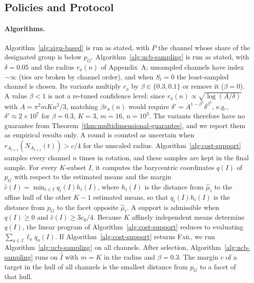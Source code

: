 \documentclass[twoside]{article}
\begin{document}
\FloatBarrier
\subsection{Policies and Protocol}
\label{app:exp-impl}

\paragraph{Algorithms.} Algorithm~\ref{alg:sign-based} is run as stated,
with \(P\) the channel whose share of the designated group is below
\(p_G\). Algorithm~\ref{alg:ucb-sampling} is run as stated, with
\(\delta=0.05\) and the radius \(r_a(n)\) of Appendix~A; unsampled
channels have index \(-\infty\) (ties are broken by channel order), and
when \(S_t=0\) the least-sampled channel is chosen. Its variants multiply
\(r_a\) by \(\beta\in\{0.3,0.1\}\) or remove it (\(\beta=0\)). A value \(\beta<1\) is not a re-tuned confidence level:
since \(r_a(n)\propto\sqrt{\log(A/\delta)}\) with \(A=\pi^2mKn^2/3\),
matching \(\beta r_a(n)\) would require \(\delta'=A^{1-\beta^2}\delta^{\beta^2}\),
e.g., \(\delta'\approx2\times10^7\) for \(\beta=0.3\), \(K=3\), \(m=16\),
\(n=10^3\). The variants therefore have no guarantee from
Theorem~\ref{thm:multidimensional-guarantee}, and we report them as
empirical results only. A round is counted as uncertain when
\(r_{A_{t+1}}(N_{A_{t+1}}(t))>c/4\) for the unscaled radius.
Algorithm~\ref{alg:cost-support} samples every channel \(n\) times in
rotation, and these samples are kept in the final sample. For every
\(K\)-subset \(I\), it computes the barycentric coordinates \(q(I)\) of
\(p_G\) with respect to the estimated means and the margin
\(\widehat c(I)=\min_{i\in I}q_i(I)h_i(I)\), where \(h_i(I)\) is the distance
from \(\widehat\mu_i\) to the affine hull of the other \(K-1\) estimated
means, so that \(q_i(I)h_i(I)\) is the distance from \(p_G\) to the facet
opposite \(\widehat\mu_i\). A support is admissible when \(q(I)\ge0\) and
\(\widehat c(I)\ge3c_0/4\). Because \(K\) affinely independent means
determine \(q(I)\), the linear program of Algorithm~\ref{alg:cost-support}
reduces to evaluating \(\sum_{a\in I}\ell_aq_a(I)\). If Algorithm~\ref{alg:cost-support} returns
\textsc{Fail}, we run Algorithm~\ref{alg:ucb-sampling} on all channels. After selection, Algorithm~\ref{alg:ucb-sampling} runs on
\(\widehat I\) with \(m=K\) in the radius and \(\beta=0.3\). The margin
\(c\) of a target in the hull of all channels is the smallest distance from
\(p_G\) to a facet of that hull.
\end{document}
